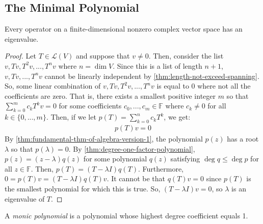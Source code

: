 \documentclass{article}
\begin{document}
\subsection{The Minimal Polynomial}

\begin{theorem}
  \label{thm:existence-of-eigenvalues}
  Every operator on a finite-dimensional nonzero complex vector space
  has an eigenvalue.
\end{theorem}
\begin{proof}
  Let $T \in \mathcal{L}(V)$ and suppose that $v \ne 0$. Then,
  consider the list $v, Tv, T^2v, ..., T^nv$ where $n = \dim V$. Since
  this is a list of length $n + 1$, $v, Tv, ..., T^nv$ cannot be
  linearly independent by \cref{thm:length-not-exceed-spanning}. So,
  some linear combination of $v, Tv, T^2v, ..., T^nv$ is equal to 0
  where not all the coefficients are zero. That is, there exists a
  smallest positive integer $m$ so that $\sum_{k=0}^m c_k
  T^kv = 0$ for some coefficients $c_0, ..., c_m \in \mathbb{F}$ where
  $c_k \ne 0$ for all $k \in \{0,...,m\}$. Then, if we let $p(T) =
  \sum_{k=0}^n c_k T^k$, we get:
  \begin{align*}
    p(T)v = 0
  \end{align*}
  By \cref{thm:fundamental-thm-of-algebra-version-1}, the polynomial
  $p(z)$ has a root $\lambda$ so that $p(\lambda) = 0$. By
  \cref{thm:degree-one-factor-polynomial}, $p(z) = (z - \lambda) q(z)$
  for some polynomial $q(z)$ satisfying $\deg q \le \deg p$ for all $z
  \in \mathbb{F}$. Then, $p(T) = (T - \lambda I) q(T)$. Furthermore,
  $0 = p(T) v = (T - \lambda I) q(T) v$. It cannot be that $q(T) v =
  0$ since $p(T)$ is the smallest polynomial for which this is
  true. So, $(T - \lambda I) v = 0$, so $\lambda$ is an eigenvalue of $T$.
\end{proof}


\begin{definition}
  \label{def:monic-polynomial}
  A \textit{monic polynomial} is a polynomial whose highest degree
  coefficient equals 1.
\end{definition}
\end{document}
